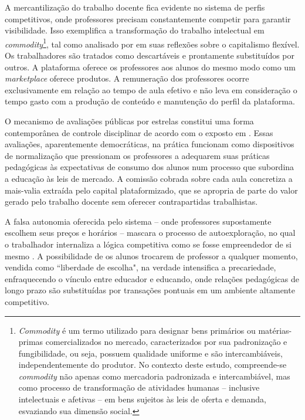 \documentclass[portuguese]{textolivre}
\begin{document}
A mercantilização do trabalho \cite{harvey2013} docente fica evidente no sistema de perfis competitivos, onde professores precisam constantemente competir para garantir visibilidade. Isso exemplifica a transformação do trabalho intelectual em \textit{commodity}\footnote{\textit{Commodity} é um termo utilizado para designar bens primários ou matérias-primas comercializados no mercado, caracterizados por sua padronização e fungibilidade, ou seja, possuem qualidade uniforme e são intercambiáveis, independentemente do produtor. No contexto deste estudo, compreende-se \textit{commodity} não apenas como mercadoria padronizada e intercambiável, mas como processo de transformação de atividades humanas -- inclusive intelectuais e afetivas -- em bens sujeitos às leis de oferta e demanda, esvaziando sua dimensão social.}, tal como analisado por \textcite{harvey2013} em suas reflexões sobre o capitalismo flexível. Os trabalhadores são tratados como descartáveis e prontamente substituídos por outros. A plataforma oferece os professores aos alunos do mesmo modo como um \textit{marketplace} oferece produtos. A remuneração dos professores ocorre exclusivamente em relação ao tempo de aula efetivo e não leva em consideração o tempo gasto com a produção de conteúdo e manutenção do perfil da plataforma.

O mecanismo de avaliações públicas por estrelas constitui uma forma contemporânea de controle disciplinar de acordo com o exposto em \textcite{antunes2020}. Essas avaliações, aparentemente democráticas, na prática funcionam como dispositivos de normalização que pressionam os professores a adequarem suas práticas pedagógicas às expectativas de consumo dos alunos num processo que subordina a educação às leis de mercado. A comissão cobrada sobre cada aula concretiza a mais-valia extraída pelo capital plataformizado, que se apropria de parte do valor gerado pelo trabalho docente sem oferecer contrapartidas trabalhistas.

A falsa autonomia oferecida pelo sistema -- onde professores supostamente escolhem seus preços e horários -- mascara o processo de autoexploração, no qual o trabalhador internaliza a lógica competitiva como se fosse empreendedor de si mesmo \cite{gonsales2020}. A possibilidade de os alunos trocarem de professor a qualquer momento, vendida como ``liberdade de escolha", na verdade intensifica a precariedade, enfraquecendo o vínculo entre educador e educando, onde relações pedagógicas de longo prazo são substituídas por transações pontuais em um ambiente altamente competitivo.
\end{document}
